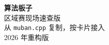 
\renewcommand{\handbooktitle}{区域赛现场速查版}


\begin{titlepage}
\centering
\vspace*{5cm}
{\Huge\bfseries 算法板子}\\[1.2cm]
{\Large 区域赛现场速查版}\\[1cm]
{\large 从 \texttt{muban.cpp} 复制，按卡片接入}\\
\vfill
{\large 2026 年重构版}
\end{titlepage}

\tableofcontents








